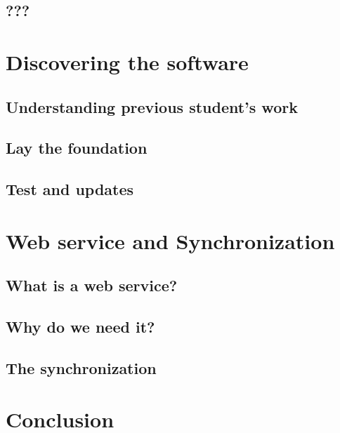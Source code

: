 \documentclass[11pt]{report} %
\begin{document}
\section{???}
%
%


\chapter{Discovering the software}
\section{Understanding previous student's work}
%
%
%
\section{Lay the foundation}
%
%
%
%
\section{Test and updates}
%
%
%

\chapter{Web service and Synchronization}
\section{What is a web service?}
%
%
\section{Why do we need it?}
%
%
\section{The synchronization}
%
% 

\chapter*{Conclusion}
%
%
%
%



\end{document}
